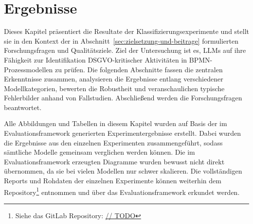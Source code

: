 \chapter{Ergebnisse}\label{ch:ergebnisse}

Dieses Kapitel präsentiert die Resultate der Klassifizierungsexperimente und stellt sie in den Kontext der in Abschnitt~\ref{sec:zielsetzung-und-beitrage} formulierten Forschungsfragen und Qualitätsziele. Ziel der Untersuchung ist es, \acp{LLM} auf ihre Fähigkeit zur Identifikation \ac{DSGVO}-kritischer Aktivitäten in \ac{BPMN}-Prozessmodellen zu prüfen. Die folgenden Abschnitte fassen die zentralen Erkenntnisse zusammen, analysieren die Ergebnisse entlang verschiedener Modellkategorien, bewerten die Robustheit und veranschaulichen typische Fehlerbilder anhand von Fallstudien. Abschließend werden die Forschungsfragen beantwortet.

Alle Abbildungen und Tabellen in diesem Kapitel wurden auf Basis der im Evaluationsframework generierten Experimentergebnisse erstellt. Dabei wurden die Ergebnisse aus den einzelnen Experimenten zusammengeführt, sodass sämtliche Modelle gemeinsam verglichen werden können. Die im Evaluationsframework erzeugten Diagramme wurden bewusst nicht direkt übernommen, da sie bei vielen Modellen nur schwer skalieren. Die vollständigen Reports und Rohdaten der einzelnen Experimente können weiterhin dem Repository\footnote{Siehe das GitLab Repository: \hyperlink{// TODO}{// TODO}} entnommen und über das Evaluationsframework erkundet werden.






